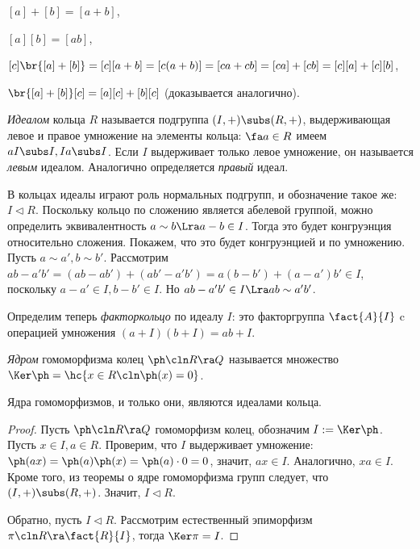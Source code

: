 \documentclass[a4paper]{article}
\newcommand{\kph}{\Ker \ph}
\begin{document}
 $[a]+[b]=[a+b]$,

 $[a][b]=[ab]$,

 $[c]\br{[a]+[b]}=[c][a+b]=[c(a+b)]=[ca+cb]=[ca]+[cb]=[c][a]+[c][b]$,

 $\br{[a]+[b]}[c]=[a][c]+[b][c]$ (доказывается аналогично).

\begin{df}
\emph{Идеалом} кольца $R$ называется подгруппа $(I,+) \subs (R,+)$,  выдерживающая левое и правое умножение
на элементы кольца: $\fa a \in R$ имеем $aI \subs I, Ia \subs I$. Если $I$ выдерживает только левое
умножение, он называется \emph{левым} идеалом. Аналогично определяется \emph{правый} идеал.
\end{df}

В кольцах идеалы играют роль нормальных подгрупп, и обозначение такое же:  $I \lhd R$. Поскольку кольцо по
сложению является абелевой группой, можно определить эквивалентность $a\sim b \Lra a - b \in I$. Тогда это
будет конгруэнция относительно сложения. Покажем, что это будет конгруэнцией и по умножению. Пусть $a \sim
a', b \sim b'$. Рассмотрим $ab-a'b'=(ab-ab')+(ab'-a'b')=a(b-b')+(a-a')b' \in I$, поскольку $a-a' \in I, b-b'
\in I$. Но $ab-a'b' \in I \Lra ab \sim a'b'$.

\begin{df}
Определим теперь \emph{факторкольцо} по идеалу $I$: это факторгруппа  $\fact{A}{I}$ c операцией умножения
$(a+I)(b+I)= ab + I$.
\end{df}

\begin{df}
\emph{Ядром} гомоморфизма колец $\ph\cln R \ra Q$ называется множество $\kph = \hc{x \in R\cln \ph(x)=0}$.
\end{df}

\begin{theorem}
Ядра гомоморфизмов, и только они, являются идеалами кольца.
\end{theorem}
\begin{proof}
 Пусть $\ph\cln R \ra Q$ гомоморфизм колец, обозначим $I := \kph$.  Пусть $x \in I, a \in R$. Проверим,
что $I$ выдерживает умножение: $\ph(ax)=\ph(a)\ph(x)=\ph(a)\cdot 0=0$, значит, $ax \in I$. Аналогично, $xa
\in I$. Кроме того, из теоремы о ядре гомоморфизма групп следует, что $(I,+) \subs (R, +)$. Значит, $I \lhd
R$.

 Обратно, пусть $I \lhd R$. Рассмотрим естественный эпиморфизм  $\pi\cln R \ra \fact{R}{I}$, тогда
$\Ker \pi = I$.
\end{proof}
\end{document}
